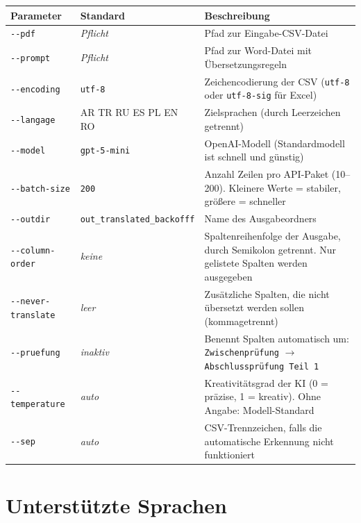 \documentclass[a4paper,11pt]{article}
\begin{document}
\begin{center}
\begin{tabularx}{0.96\textwidth}{@{}l l X@{}}
\toprule
\textbf{Parameter} & \textbf{Standard} & \textbf{Beschreibung} \\
\midrule
\texttt{-{}-pdf} & \textit{Pflicht} &
  Pfad zur Eingabe-CSV-Datei \\[4pt]
\texttt{-{}-prompt} & \textit{Pflicht} &
  Pfad zur Word-Datei mit Übersetzungsregeln \\[4pt]
\texttt{-{}-encoding} & \texttt{utf-8} &
  Zeichencodierung der CSV (\texttt{utf-8} oder \texttt{utf-8-sig} für Excel) \\[4pt]
\texttt{-{}-langage} & AR TR RU ES PL EN RO &
  Zielsprachen (durch Leerzeichen getrennt) \\[4pt]
\texttt{-{}-model} & \texttt{gpt-5-mini} &
  OpenAI-Modell (Standardmodell ist schnell und günstig) \\[4pt]
\texttt{-{}-batch-size} & \texttt{200} &
  Anzahl Zeilen pro API-Paket (10–200). Kleinere Werte = stabiler, größere = schneller \\[4pt]
\texttt{-{}-outdir} & \texttt{out\_translated\_backofff} &
  Name des Ausgabeordners \\[4pt]
\texttt{-{}-column-order} & \textit{keine} &
  Spaltenreihenfolge der Ausgabe, durch Semikolon getrennt. Nur gelistete Spalten
  werden ausgegeben \\[4pt]
\texttt{-{}-never-translate} & \textit{leer} &
  Zusätzliche Spalten, die nicht übersetzt werden sollen (kommagetrennt) \\[4pt]
\texttt{-{}-pruefung} & \textit{inaktiv} &
  Benennt Spalten automatisch um: \texttt{Zwischenprüfung}
  $\to$ \texttt{Abschlussprüfung Teil 1} \\[4pt]
\texttt{-{}-temperature} & \textit{auto} &
  Kreativitätsgrad der KI (0 = präzise, 1 = kreativ). Ohne Angabe: Modell-Standard \\[4pt]
\texttt{-{}-sep} & \textit{auto} &
  CSV-Trennzeichen, falls die automatische Erkennung nicht funktioniert \\
\bottomrule
\end{tabularx}
\end{center}

\section{Unterstützte Sprachen}
\end{document}
